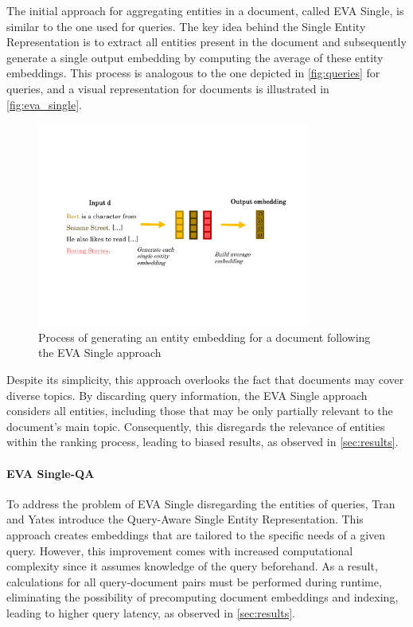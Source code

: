 The initial approach for aggregating entities in a document, called EVA Single, is similar to the one used for queries. The key idea behind the Single Entity Representation is to extract all entities present in the document and subsequently generate a single output embedding by computing the average of these entity embeddings. This process is analogous to the one depicted in \autoref{fig:queries} for queries, and a visual representation for documents is illustrated in \autoref{fig:eva_single}.

\begin{figure}[!htb]
    \centering
    \includegraphics[trim={2cm 5cm 1.5cm 6.5cm}, clip, width=0.8\textwidth]{resources/eva_single} 
    \caption{Process of generating an entity embedding for a document following the EVA Single approach}
    \label{fig:eva_single}
\end{figure}

Despite its simplicity, this approach overlooks the fact that documents may cover diverse topics. By discarding query information, the EVA Single approach considers all entities, including those that may be only partially relevant to the document's main topic. Consequently, this disregards the relevance of entities within the ranking process, leading to biased results, as observed in \autoref{sec:results}.

\paragraph*{EVA Single-QA}

To address the problem of EVA Single disregarding the entities of queries, Tran and Yates introduce the Query-Aware Single Entity Representation. This approach creates embeddings that are tailored to the specific needs of a given query. However, this improvement comes with increased computational complexity since it assumes knowledge of the query beforehand. As a result, calculations for all query-document pairs must be performed during runtime, eliminating the possibility of precomputing document embeddings and indexing, leading to higher query latency, as observed in \autoref{sec:results}.

